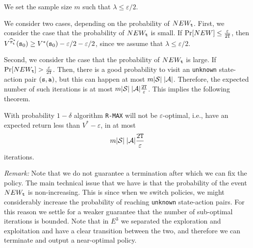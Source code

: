 We set the sample size $m$ such that $\lambda \leq\varepsilon/2$.

We consider two cases, depending on the probability of $NEW_{\tt t}$. First,
we consider the case that the probability of $NEW_{\tt t}$ is small. If
$\Pr[NEW]\leq \frac{\varepsilon}{2{\tt T}}$, then
$V^{\widehat{\pi}^*_{\tt t}}({\tt s}_0)\geq V^*({\tt s}_0)
-\varepsilon/2 -\varepsilon/2$, since we assume that $\lambda\leq
\varepsilon/2$.

Second, we consider the case that the probability of $NEW_{\tt t}$ is large.
If $\Pr[NEW_{\tt t}] > \frac{\varepsilon}{2{\tt T}}$. Then, there is a good
probability to visit an \texttt{unknown} state-action pair $({\tt s},{\tt a})$, but this
can happen at most $m|\mathcal{S}|\;|\mathcal{A}|$. Therefore, the expected
number of such iterations is at most
$m|\mathcal{S}|\;|\mathcal{A}|\frac{2{\tt T}}{\varepsilon}$.
This implies the following theorem.


\begin{theorem}
With probability $1-\delta$ algorithm \texttt{R-MAX} will not be $\varepsilon$-optimal, i.e., have an expected return less than $V^*-\varepsilon$, in at most 
\[
m|\mathcal{S}|\;|\mathcal{A}|\frac{2{\tt T}}{\varepsilon}
\]
iterations.
\end{theorem}

\noindent\textit{Remark:} Note that we do not guarantee a termination after which we can fix the policy. The main technical issue that we have is that the probability of the event $NEW_{\tt t}$ is non-increasing. This is since when we switch policies, we might considerably increase the probability of reaching \texttt{unknown} state-action pairs. For this reason we settle for a weaker guarantee that the number of sub-optimal iterations is bounded. Note that in $E^3$ we separated the exploration and exploitation and have a clear transition between the two, and therefore we can terminate and output a near-optimal policy.


